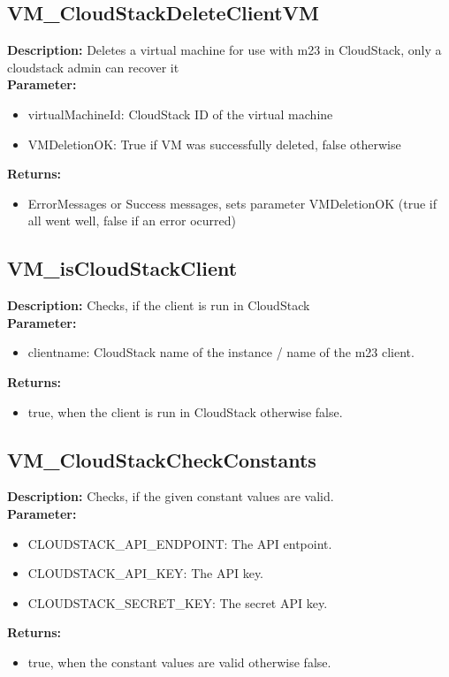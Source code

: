 \subsection{VM\_CloudStackDeleteClientVM}
\textbf{Description:} Deletes a virtual machine for use with m23 in CloudStack, only a cloudstack admin can recover it\\
\textbf{Parameter:}
\begin{itemize}
\item virtualMachineId:  CloudStack ID of the virtual machine
\item VMDeletionOK: True if VM was successfully deleted, false otherwise
\end{itemize}
\textbf{Returns:}
\begin{itemize}
\item ErrorMessages or Success messages, sets parameter VMDeletionOK (true if all went well, false if an error ocurred)
\end{itemize}

\subsection{VM\_isCloudStackClient}
\textbf{Description:} Checks, if the client is run in CloudStack\\
\textbf{Parameter:}
\begin{itemize}
\item clientname: CloudStack name of the instance / name of the m23 client.
\end{itemize}
\textbf{Returns:}
\begin{itemize}
\item true, when the client is run in CloudStack otherwise false.
\end{itemize}

\subsection{VM\_CloudStackCheckConstants}
\textbf{Description:} Checks, if the given constant values are valid.\\
\textbf{Parameter:}
\begin{itemize}
\item CLOUDSTACK\_API\_ENDPOINT: The API entpoint.
\item CLOUDSTACK\_API\_KEY: The API key.
\item CLOUDSTACK\_SECRET\_KEY: The secret API key.
\end{itemize}
\textbf{Returns:}
\begin{itemize}
\item true, when the constant values are valid otherwise false.
\end{itemize}

